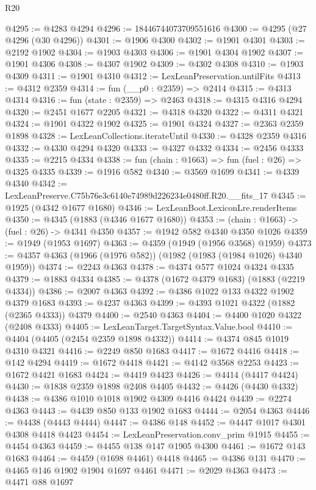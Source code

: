 \begin{lexlean}{R20}
\begin{coremodule}
@4295 := @4283 @4294
@4296 := 18446744073709551616
@4300 := @4295 (@27 @4296 (@30 @4296))
@4301 := @1906 @4300
@4302 := @1901 @4301
@4303 := @2192 @1902
@4304 := @1903 @4303
@4306 := @1901 @4304 @1902
@4307 := @1901 @4306
@4308 := @4307 @1902
@4309 := @4302 @4308
@4310 := @1903 @4309
@4311 := @1901 @4310
@4312 := LexLeanPreservation.untilFits
@4313 := @4312 @2359
@4314 := fun (__p0 : @2359) => @2414
@4315 := @4313 @4314
@4316 := fun (state : @2359) => @2463
@4318 := @4315 @4316 @4294
@4320 := @2451 @1677 @2205
@4321 := @4318 @4320
@4322 := @4311 @4321
@4324 := @1901 @4322 @1902
@4325 := @1901 @4324
@4327 := @2363 @2359 @1898
@4328 := LexLeanCollections.iterateUntil
@4330 := @4328 @2359 @4316
@4332 := @4330 @4294 @4320
@4333 := @4327 @4332
@4334 := @2456 @4333
@4335 := @2215 @4334
@4338 := fun (chain : @1663) => fun (fuel : @26) => @4325 @4335
@4339 := @1916 @582
@4340 := @3569 @1699
@4341 := @4339 @4340
@4342 := LexLeanPreserve.C75b76e3c6140e74989d226234e0480ff.R20.__fits_17
@4345 := @1925 (@4342 @1677 @1680)
@4346 := LexLeanBoot.LexiconLre.renderItems
@4350 := @4345 (@1883 (@4346 @1677 @1680))
@4353 := (chain : @1663) -> (fuel : @26) -> @4341 @4350
@4357 := @1942 @582 @4340 @4350 @1026
@4359 := @1949 (@1953 @1697)
@4363 := @4359 (@1949 (@1956 @3568) @1959)
@4373 := @4357 @4363 (@1966 (@1976 @582)) (@1982 (@1983 (@1984 @1026) @4340 @1959))
@4374 := @2243 @4363
@4378 := @4374 @577 @1024 @4324 @4335
@4379 := @1883 @4334
@4385 := @4378 (@1672 @4379 @1683) (@1883 (@2219 @4334))
@4386 := @2007 @4363
@4392 := @4386 @1022 @133 @4322 @1902 @4379 @1683
@4393 := @4237 @4363
@4399 := @4393 @1021 @4322 (@1882 (@2365 @4333)) @4379
@4400 := @2540 @4363
@4404 := @4400 @1020 @4322 (@2408 @4333)
@4405 := LexLeanTarget.TargetSyntax.Value.bool
@4410 := @4404 (@4405 (@2454 @2359 @1898 @4332))
@4414 := @4374 @845 @1019 @4310 @4321
@4416 := @2249 @850 @1683
@4417 := @1672 @4416
@4418 := @142 @4294
@4419 := @1672 @4418
@4421 := @4142 @3568 @2253
@4423 := @1672 @4421 @1683
@4424 := @4419 @4423
@4426 := @4414 (@4417 @4424)
@4430 := @1838 @2359 @1898 @2408 @4405
@4432 := @4426 (@4430 @4332)
@4438 := @4386 @1010 @1018 @1902 @4309 @4416 @4424
@4439 := @2274 @4363
@4443 := @4439 @850 @133 @1902 @1683
@4444 := @2054 @4363
@4446 := @4438 (@4443 @4444)
@4447 := @4386 @148
@4452 := @4447 @1017 @4301 @4308 @4418 @4423
@4454 := LexLeanPreservation.conv_prim @1915
@4455 := @4454 @4363
@4459 := @4455 @138 @147 @1905 @4300
@4461 := @1672 @143 @1683
@4464 := @4459 (@1698 @4461) @4418
@4465 := @4386 @131
@4470 := @4465 @146 @1902 @1904 @1697 @4461
@4471 := @2029 @4363
@4473 := @4471 @88 @1697

\end{coremodule}
\end{lexlean}

